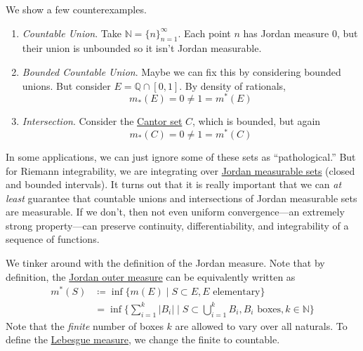  \begin{example}
    \label{ex:countable-union-intersection-of-jordan}
    We show a few counterexamples. 
    \begin{enumerate}
      \item \textit{Countable Union}. Take $\mathbb{N} = \{n\}_{n=1}^\infty$. Each point $n$ has Jordan measure $0$, but their union is unbounded so it isn't Jordan measurable. 

      \item \textit{Bounded Countable Union}. Maybe we can fix this by considering bounded unions. But consider $E = \mathbb{Q} \cap [0, 1]$. By density of rationals, 
      \begin{equation}
        m_\ast (E) = 0 \neq 1 = m^\ast (E)
      \end{equation}
        
      \item \textit{Intersection}. Consider the \hyperref[ex:cantor-set-is-measurable]{Cantor set} $C$, which is bounded, but again 
      \begin{equation}
        m_\ast (C) = 0 \neq 1 = m^\ast (C)
      \end{equation}
    \end{enumerate}
  \end{example}

  In some applications, we can just ignore some of these sets as ``pathological.'' But for Riemann integrability, we are integrating over \hyperref[def:jordan-measurable-set-jordan-measure]{Jordan measurable sets} (closed and bounded intervals). It turns out that it is really important that we can \textit{at least} guarantee that countable unions and intersections of Jordan measurable sets are measurable. If we don't, then not even uniform convergence---an extremely strong property---can preserve continuity, differentiability, and integrability of a sequence of functions. 

	We tinker around with the definition of the Jordan measure. Note that by definition, the \hyperref[def:jordan-outer-inner-measure]{Jordan outer measure} can be equivalently written as 
  \begin{align}
    m^\ast (S) & \coloneqq \inf \{ m(E) \mid S \subset E, E \text{ elementary} \} \\ 
               & = \inf \bigg\{ \sum_{i=1}^k |B_i| \;\bigg|\; S \subset \bigcup_{i=1}^k B_i, B_i \text{ boxes}, k \in \mathbb{N} \bigg\}
  \end{align}
  Note that the \textit{finite} number of boxes $k$ are allowed to vary over all naturals. To define the \hyperref[def:lebesgue-measure]{Lebesgue measure}, we change the finite to countable.

